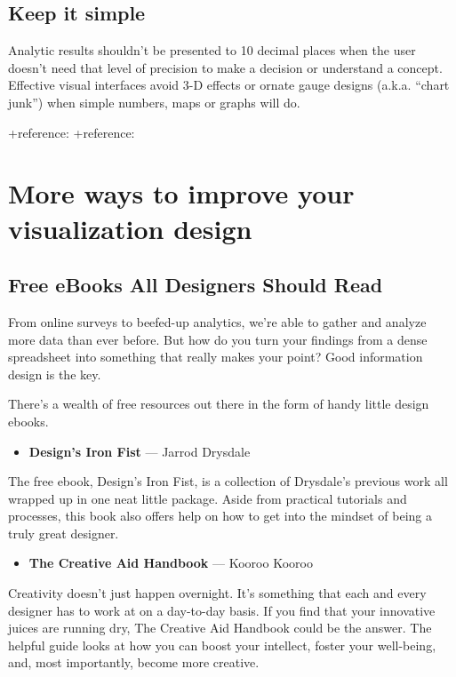 \documentclass[]{book}
\providecommand{\tightlist}{%
  \setlength{\itemsep}{0pt}\setlength{\parskip}{0pt}}
\theoremstyle{definition}
\theoremstyle{definition}
\theoremstyle{definition}
\theoremstyle{remark}
\begin{document}
\subsection{Keep it simple}\label{keep-it-simple}

Analytic results shouldn't be presented to 10 decimal places when the
user doesn't need that level of precision to make a decision or
understand a concept. Effective visual interfaces avoid 3-D effects or
ornate gauge designs (a.k.a. ``chart junk'') when simple numbers, maps
or graphs will do.

+reference: \citep{French} +reference: \citep{Steier}

\section{More ways to improve your visualization
design}\label{more-ways-to-improve-your-visualization-design}

\subsection{Free eBooks All Designers Should
Read}\label{free-ebooks-all-designers-should-read}

From online surveys to beefed-up analytics, we're able to gather and
analyze more data than ever before. But how do you turn your findings
from a dense spreadsheet into something that really makes your point?
Good information design is the key.

There's a wealth of free resources out there in the form of handy little
design ebooks.

\begin{itemize}
\tightlist
\item
  \textbf{Design's Iron Fist} --- Jarrod Drysdale
\end{itemize}

The free ebook, Design's Iron Fist, is a collection of Drysdale's
previous work all wrapped up in one neat little package. Aside from
practical tutorials and processes, this book also offers help on how to
get into the mindset of being a truly great designer.

\begin{itemize}
\tightlist
\item
  \textbf{The Creative Aid Handbook} --- Kooroo Kooroo
\end{itemize}

Creativity doesn't just happen overnight. It's something that each and
every designer has to work at on a day-to-day basis. If you find that
your innovative juices are running dry, The Creative Aid Handbook could
be the answer. The helpful guide looks at how you can boost your
intellect, foster your well-being, and, most importantly, become more
creative.
\end{document}
